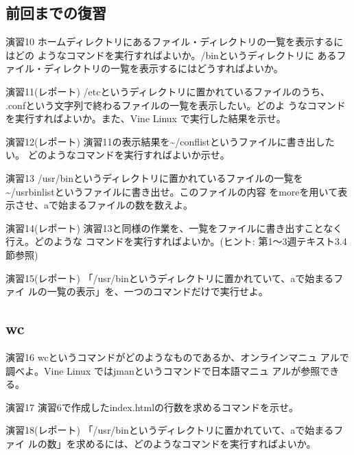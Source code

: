 \documentclass[a4j,10pt]{jarticle}
\begin{document}
\subsection{前回までの復習}
\begin{itembox}{演習10}
 ホームディレクトリにあるファイル・ディレクトリの一覧を表示するにはどの
 ようなコマンドを実行すればよいか。{\sffamily /bin}というディレクトリに
 あるファイル・ディレクトリの一覧を表示するにはどうすればよいか。
\end{itembox}
\begin{itembox}{演習11(レポート)}
 {\sffamily /etc}というディレクトリに置かれているファイルのうち、
 {\sffamily .conf}という文字列で終わるファイルの一覧を表示したい。どのよ
 うなコマンドを実行すればよいか。また、Vine Linux で実行した結果を示せ。
\end{itembox}
\begin{itembox}{演習12(レポート)}
 演習11の表示結果を{\sffamily \~{}/conflist}というファイルに書き出したい。
 どのようなコマンドを実行すればよいか示せ。
\end{itembox}
\begin{itembox}{演習13}
 {\sffamily /usr/bin}というディレクトリに置かれているファイルの一覧を
 {\sffamily \~{}/usrbinlist}というファイルに書き出せ。このファイルの内容
 を{\sffamily more}を用いて表示させ、aで始まるファイルの数を数えよ。
\end{itembox}
\begin{itembox}{演習14(レポート)}
 演習13と同様の作業を、一覧をファイルに書き出すことなく行え。どのような
 コマンドを実行すればよいか。(ヒント: 第1〜3週テキスト3.4節参照)
\end{itembox}
\begin{itembox}{演習15(レポート)}
 「{\sffamily /usr/bin}というディレクトリに置かれていて、aで始まるファイ
 ルの一覧の表示」を、一つのコマンドだけで実行せよ。
\end{itembox}
\subsection{wc}
\begin{itembox}{演習16}
 {\sffamily wc}というコマンドがどのようなものであるか、オンラインマニュ
 アルで調べよ。Vine Linux では{\sffamily jman}というコマンドで日本語マニュ
 アルが参照できる。
\end{itembox}
\begin{itembox}{演習17}
 演習6で作成した{\sffamily index.html}の行数を求めるコマンドを示せ。
\end{itembox}
\begin{itembox}{演習18(レポート)}
 「{\sffamily /usr/bin}というディレクトリに置かれていて、aで始まるファイ
 ルの数」を求めるには、どのようなコマンドを実行すればよいか。
\end{itembox}
\end{document}
